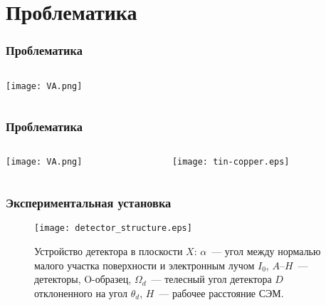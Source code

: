 \documentclass{beamer}
\begin{document}

\section{Проблематика}
\begin{frame}
    \sectionpage
\end{frame}

\begin{frame}[c]
    \frametitle{Проблематика}
    \begin{columns}
        \begin{column}{0.5\textwidth}
            \texttt{[image: VA.png]}
        \end{column}
        \begin{column}{0.5\textwidth}
        \end{column}
    \end{columns}
\end{frame}

\begin{frame}[c]
    \frametitle{Проблематика}
    \begin{columns}
        \begin{column}{0.38\textwidth}
            \texttt{[image: VA.png]}
        \end{column}
        \begin{column}{0.58\textwidth}
            \texttt{[image: tin-copper.eps]}
        \end{column}
    \end{columns}
\end{frame}

\begin{frame}
    \frametitle{Экспериментальная установка}
    \begin{figure}
        \texttt{[image: detector\_structure.eps]}
        \caption{Устройство детектора в плоскости $X$: $\alpha$~--- угол между нормалью малого
участка поверхности и электронным лучом $I_0$, $A$--$H$~--- детекторы, O-образец,
$\Omega_{d}$~--- телесный угол детектора $D$ отклоненного на угол $\theta_d$, $H$~--- рабочее
расстояние СЭМ.}
        {\label{fig:detector_structure}}%
    \end{figure}
\end{frame}
\end{document}
